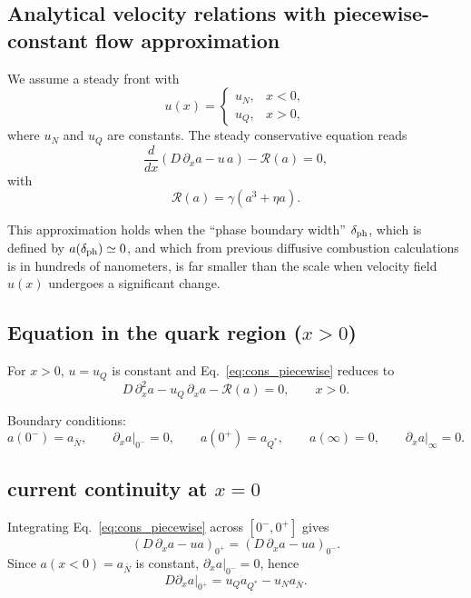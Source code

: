 \documentclass[11pt]{article}
\begin{document}
\subsection*{Analytical velocity relations with piecewise-constant flow approximation}

We assume a steady front with
\begin{equation}
u(x)=
\begin{cases}
u_N, & x<0,\\
u_Q, & x>0,
\end{cases}
\end{equation}
where $u_N$ and $u_Q$ are constants. The steady conservative equation reads
\begin{equation}
\frac{d}{dx}\!\left(D\,\partial_x a - u\,a\right) - \mathcal R(a)=0,
\label{eq:cons_piecewise}
\end{equation}
with
\begin{equation}
\mathcal R(a)=\gamma\left(a^3+\eta a\right).
\label{eq:R_cubic}
\end{equation}

This approximation holds when the ``phase boundary width'' $\delta_{\rm ph}$, which is defined by $a(\delta_{\rm ph})\simeq 0$, and which from previous diffusive combustion calculations is in hundreds of nanometers, is far smaller than the scale when velocity field $u(x)$ undergoes a significant change. 

\subsection*{Equation in the quark region ($x>0$)}

For $x>0$, $u=u_Q$ is constant and Eq.~\eqref{eq:cons_piecewise} reduces to
\begin{equation}
D\,\partial_x^2 a - u_Q\,\partial_x a - \mathcal R(a)=0,
\qquad x>0.
\label{eq:ode_quark}
\end{equation}

Boundary conditions:
\[
a(0^-) = a_{\bar N},
\qquad 
\left.\partial_x a\right|_{0^-} = 0,
\qquad 
a(0^+)=a_{Q^*},
\qquad
a(\infty)=0,
\qquad
\left.\partial_x a\right|_{\infty}=0.
\]

\subsection*{current continuity at $x=0$}

Integrating Eq.~\eqref{eq:cons_piecewise} across $[0^-,0^+]$ gives
\begin{equation}
\left(D\,\partial_x a - u a\right)_{0^+}=\left(D\,\partial_x a - u a\right)_{0^-}.
\end{equation}
Since $a(x<0)=a_{\bar N}$ is constant, $\left.\partial_x a\right|_{0^-}=0$, hence
\begin{equation}
D\left.\partial_x a\right|_{0^+}
=
u_Q a_{Q^*}
-
u_N a_{\bar N}.
\label{eq:boundary_general}
\end{equation}
\end{document}
